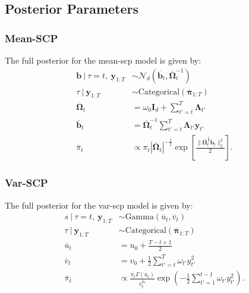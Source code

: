 \subsection{Posterior Parameters}
\label{app:posterior-parameters}

\subsubsection{Mean-SCP}

The full posterior for the mean-scp model is given by:
\begin{align}
    \mathbf{b} \:|\: \tau = t, \: \mathbf{y}_{1:T} &\sim \mathcal{N}_d\left(\overline{\mathbf{b}}_{t}, \overline{\boldsymbol{\Omega}}_t^{-1}\right) \\
    \tau \:|\: \mathbf{y}_{1:T} &\sim \text{Categorical}(\overline{\boldsymbol{\pi}}_{1:T})  \\
    \overline{\boldsymbol{\Omega}}_t &= \omega_0\mathbf{I}_d + \sum_{t'=t}^{T} \boldsymbol{\Lambda}_{t'} \label{eq:mean-scp-post-omega}\\
    \overline{\mathbf{b}}_t &= \overline{\boldsymbol{\Omega}}_t^{-1}\sum_{t'=t}^{T} \boldsymbol{\Lambda}_{t'} \mathbf{y}_{t'} \label{eq:mean-scp-post-b}\\
    \overline{\pi}_t &\propto \pi_t|\overline{\boldsymbol{\Omega}}_t|^{-
    \frac{1}{2}}\exp\left[\frac{\lVert \overline{\boldsymbol{\Omega}}_t^{\frac{1}{2}} \overline{\mathbf{b}}_t\rVert_2^2}{2}\right].  \label{eq:mean-scp-post-pi}
\end{align}

\subsubsection{Var-SCP}

The full posterior for the var-scp model is given by:
\begin{align}
    s \:|\: \tau = t, \: \mathbf{y}_{1:T} &\sim \text{Gamma}\left(\overline{u}_{t}, \overline{v}_{t}\right) \\
    \tau \:|\: \mathbf{y}_{1:T}&\sim \text{Categorical}(\overline{\boldsymbol{\pi}}_{1:T}) \\
    \overline{u}_{t} &= u_0 + \frac{T - t + 1}{2} \label{eq:var-scp-post-u} \\
    \overline{v}_{t} &= v_0 + \frac{1}{2} \sum_{t'=t}^{T} \omega_{t'}y_{t'}^2 \label{eq:var-scp-post-v} \\
    \overline{\pi}_t &\propto  \frac{\pi_t\Gamma(\overline{u}_{t})}{\overline{v}_{t}^{\overline{u}_{t}}}\exp\left(- \frac{1}{2}\sum_{t'=1}^{t-1} \omega_{t'}y_{t'}^2\right). \label{eq:var-scp-post-pi}
\end{align}

